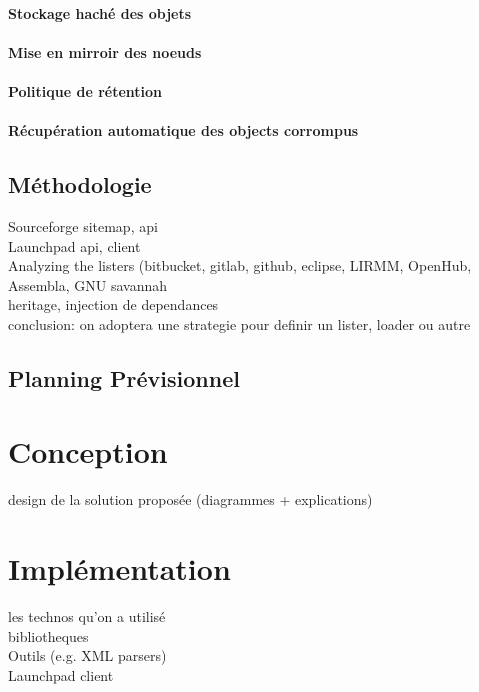 \documentclass[12pt,a4paper]{report}
\begin{document}
\subsubsection{Stockage haché des objets}

\subsubsection{Mise en mirroir des noeuds}

\subsubsection{Politique de rétention}

\subsubsection{Récupération automatique des objects corrompus}

\section{Méthodologie}
Sourceforge sitemap, api\\
Launchpad api, client\\
Analyzing the listers (bitbucket, gitlab, github, eclipse, LIRMM, OpenHub, 			Assembla, GNU savannah\\
heritage, injection de dependances\\
conclusion: on adoptera une strategie pour definir un lister, loader ou autre\\

\section{Planning Prévisionnel}

\chapter{Conception}
design de la solution proposée (diagrammes + explications)

\chapter{Implémentation}
les technos qu'on a utilisé\\
bibliotheques\\
Outils (e.g. XML parsers)\\
Launchpad client
\end{document}

